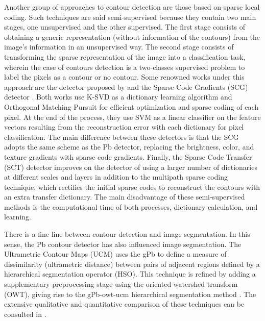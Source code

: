 Another group of approaches to contour detection are those based on sparse local coding. Such techniques are said semi-supervised because they contain two main stages, one unsupervised and the other supervised. The first stage consists of obtaining a generic representation (without information of the contours) from the image's information in an unsupervised way. The second stage consists of transforming the sparse representation of the image into a classification task, wherein the case of contours detection is a two-classes supervised problem to label the pixels as a contour or no contour. Some renowned works under this approach are the detector proposed by \cite{Mairal.Leordeanu.ea:ECCV:2008} and the Sparse Code Gradients (SCG) detector \citep{Ren.Bo:NIPS:2012}. Both works use K-SVD as a dictionary learning algorithm and Orthogonal Matching Pursuit for efficient optimization and sparse coding of each pixel. At the end of the process, they use SVM as a linear classifier on the feature vectors resulting from the reconstruction error with each dictionary for pixel classification. The main difference between these detectors is that the SCG adopts the same scheme as the Pb detector, replacing the brightness, color, and texture gradients with sparse code gradients. Finally, the Sparse Code Transfer (SCT) detector \citep{Maire.Yu.ea:ACCV:2014} improves on the detector of \cite{Mairal.Leordeanu.ea:ECCV:2008} using a larger number of dictionaries at different scales and layers in addition to the multipath sparse coding technique, which rectifies the initial sparse codes to reconstruct the contours with an extra transfer dictionary. The main disadvantage of these semi-supervised methods is the computational time of both processes, dictionary calculation, and learning. 

There is a fine line between contour detection and image segmentation. In this sense, the Pb contour detector has also influenced image segmentation. The Ultrametric Contour Maps (UCM) \citep{Arbelaez.Maire.ea:PR:2009} uses the gPb to define a measure of dissimilarity (ultrametric distance) between pairs of adjacent regions defined by a hierarchical segmentation operator (HSO). This technique is refined by adding a supplementary preprocessing stage using the oriented watershed transform (OWT), giving rise to the gPb-owt-ucm hierarchical segmentation method \citep{Arbelaez.Maire.ea:PR:2009}. The extensive qualitative and quantitative comparison of these techniques can be consulted in \citep{Arbelaez.Maire.ea:PAMI:2011}.

